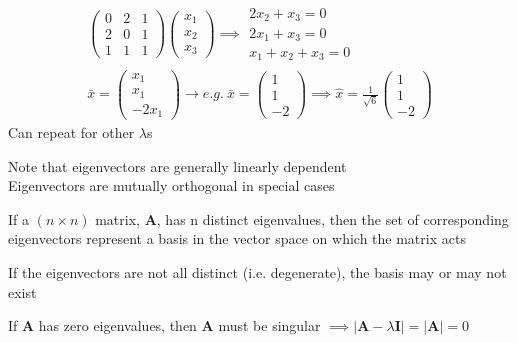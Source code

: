 \documentclass[a4paper, 11pt, normalem]{report}
\begin{document}
\begin{gather*}
    \begin{pmatrix}
        0 & 2 & 1 \\
        2 & 0 & 1 \\
        1 & 1 & 1
    \end{pmatrix}
    \begin{pmatrix}
        x_1 \\
        x_2 \\
        x_3
    \end{pmatrix} \implies
    \begin{matrix*}
        2x_2 + x_3 = 0 \\
        2x_1 + x_3 = 0 \\
        x_1 + x_2 + x_3 = 0
    \end{matrix*} \\
    \bar{x} =
    \begin{pmatrix}
          x_1 \\
          x_1 \\
        -2x_1
    \end{pmatrix} \to e.g.~ \bar{x} =
    \begin{pmatrix}
         1 \\
         1 \\
        -2
    \end{pmatrix} \implies \hat{x} = \frac{1}{\sqrt{6}}
    \begin{pmatrix}
         1 \\
         1 \\
        -2
    \end{pmatrix}
\end{gather*}
Can repeat for other $\lambda$s

Note that eigenvectors are generally linearly dependent \\
Eigenvectors are mutually orthogonal in special cases

If a $(n \times n)$ matrix, $\mathbf{A}$, has n distinct eigenvalues, then the set of corresponding eigenvectors represent a basis in the vector space on which the matrix acts

If the eigenvectors are not all distinct (i.e. degenerate), the basis may or may not exist

If $\mathbf{A}$ has zero eigenvalues, then $\mathbf{A}$ must be singular $\implies |\mathbf{A} - \lambda\mathbf{I}| = |\mathbf{A}| = 0$
\end{document}
